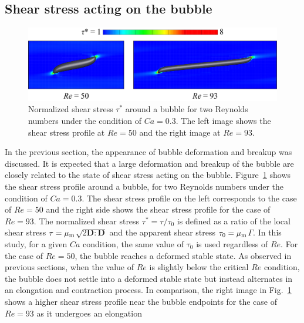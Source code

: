 \documentclass[%
 reprint,
 showkeys,
 amsmath,amssymb,
 aps,
 prfluids,
 onecolumn
]{revtex4-2}
\newcommand{\vv}{\mathbf}
\newcommand{\bmD}{\vv{D}}
\begin{document}
{\color{blue} 
\subsection{Shear stress acting on the bubble}
%
\begin{figure}%
  \centering
  \includegraphics[width=\textwidth]{ShearStress}
  \caption{Normalized shear stress $\tau^{\ast}$ around a bubble for 
	two Reynolds 
        numbers under the condition of $Ca = 0.3$. The left image shows the 
        shear stress profile at $Re=50$ and the right image at $Re=93$.
   }
  \label{fig:ShearStress}
\end{figure}
%
In the previous section, the appearance of bubble deformation and breakup was
discussed. It is expected that a large deformation and breakup of the bubble
are closely related to the state of shear stress acting on the bubble.
Figure~\ref{fig:ShearStress} shows the shear stress profile around a bubble,
for two Reynolds numbers under the condition of $Ca = 0.3$.  The shear stress
profile on the left corresponds to the case of $Re = 50$ and the right side
shows the shear stress profile for the case of $Re = 93$.  The normalized shear
stress $\tau^{\ast} = \tau / \tau_{0}$ is defined as a ratio of the local shear
stress $\tau = \mu_{\rm m}$$\sqrt{2\bmD:\bmD}$ and the apparent shear stress
$\tau_{0} = \mu_{\rm m}$$\mathit{\Gamma}$.  In this study, for a given $Ca$
condition, the same value of $\tau_{0}$ is used regardless of $Re$. For the
case of $Re = 50$, the bubble reaches a deformed stable state.  As observed in
previous sections, when the value of $Re$ is slightly below the critical $Re$
condition, the bubble does not settle into a deformed stable state but instead
alternates in an elongation and contraction process.  In comparison, the right
image in Fig.~\ref{fig:ShearStress} shows a higher shear stress profile near
the bubble endpoints for the case of $Re = 93$ as it undergoes an elongation
}
\end{document}
